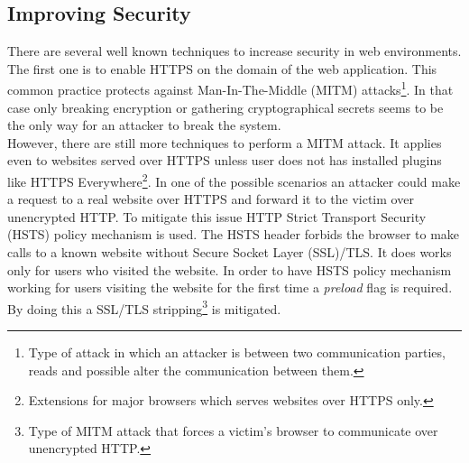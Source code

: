 \documentclass{article} %
\begin{document}
\subsection{Improving Security}
There are several well known techniques to increase security in web environments. The first one is to enable HTTPS on the domain of the web application. This common practice protects against Man-In-The-Middle (MITM) attacks\footnote{Type of attack in which an attacker is between two communication parties, reads and possible alter the communication between them.}. In that case only breaking encryption or gathering cryptographical secrets seems to be the only way for an attacker to break the system.\\
\newline
However, there are still more techniques to perform a MITM attack. It applies even to websites served over HTTPS unless user does not has installed plugins like HTTPS Everywhere\footnote{Extensions for major browsers which serves websites over HTTPS only.}. In one of the possible scenarios an attacker could make a request to a real website over HTTPS and forward it to the victim over unencrypted HTTP. To mitigate this issue HTTP Strict Transport Security (HSTS) policy mechanism is used. The HSTS header forbids the browser to make calls to a known website without Secure Socket Layer (SSL)/TLS. It does works only for users who visited the website. In order to have HSTS policy mechanism working for users visiting the website for the first time a \textit{preload} flag is required. By doing this a SSL/TLS stripping\footnote{Type of MITM attack that forces a victim's browser to communicate over unencrypted HTTP.} is mitigated.\\
\newline
\end{document}
